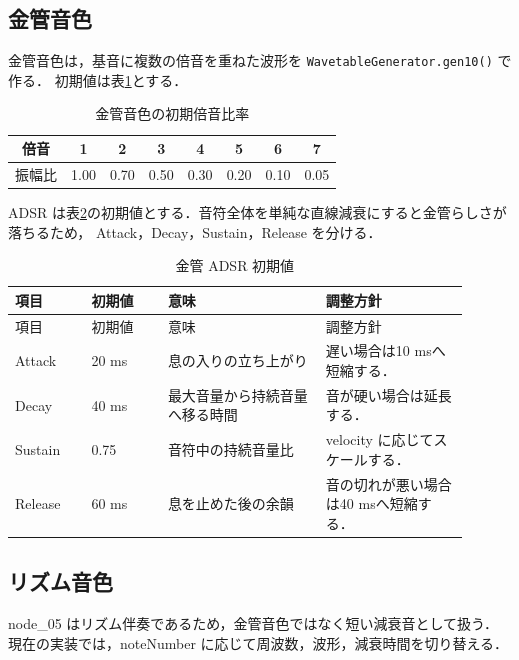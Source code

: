 \documentclass[lualatex,book,openany,paper=a4paper,jafontsize=11.5pt,jafontscale=1.05]{jlreq}
\begin{document}
\subsection{金管音色}
金管音色は，基音に複数の倍音を重ねた波形を \texttt{WavetableGenerator.gen10()} で作る．
初期値は表\ref{tab:harmonics}とする．

\begin{table}[htbp]
\centering
\caption{金管音色の初期倍音比率}\label{tab:harmonics}
\begin{tabular}{cccccccc}
\toprule
倍音 & 1 & 2 & 3 & 4 & 5 & 6 & 7 \\
\midrule
振幅比 & 1.00 & 0.70 & 0.50 & 0.30 & 0.20 & 0.10 & 0.05 \\
\bottomrule
\end{tabular}
\end{table}

ADSR は表\ref{tab:adsr}の初期値とする．音符全体を単純な直線減衰にすると金管らしさが落ちるため，
Attack，Decay，Sustain，Release を分ける．

\begin{longtable}{p{0.15\linewidth}p{0.15\linewidth}p{0.31\linewidth}p{0.29\linewidth}}
\caption{金管 ADSR 初期値}\label{tab:adsr}\\
\toprule
項目 & 初期値 & 意味 & 調整方針 \\
\midrule
\endfirsthead
\toprule
項目 & 初期値 & 意味 & 調整方針 \\
\midrule
\endhead
Attack & 20 ms & 息の入りの立ち上がり & 遅い場合は10 msへ短縮する． \\
Decay & 40 ms & 最大音量から持続音量へ移る時間 & 音が硬い場合は延長する． \\
Sustain & 0.75 & 音符中の持続音量比 & velocity に応じてスケールする． \\
Release & 60 ms & 息を止めた後の余韻 & 音の切れが悪い場合は40 msへ短縮する． \\
\bottomrule
\end{longtable}

\subsection{リズム音色}
node\_05 はリズム伴奏であるため，金管音色ではなく短い減衰音として扱う．
現在の実装では，noteNumber に応じて周波数，波形，減衰時間を切り替える．
\end{document}
